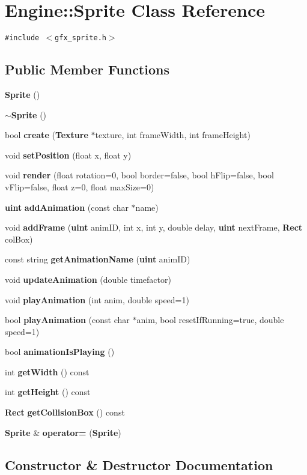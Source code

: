 \section{Engine::Sprite Class Reference}
\label{classEngine_1_1Sprite}
{\tt \#include $<$gfx\_\-sprite.h$>$}

\subsection*{Public Member Functions}
\begin{CompactItemize}
\item 
{\bf Sprite} ()
\item 
{\bf $\sim$Sprite} ()
\item 
bool {\bf create} ({\bf Texture} $\ast$texture, int frameWidth, int frameHeight)
\item 
void {\bf setPosition} (float x, float y)
\item 
void {\bf render} (float rotation=0, bool border=false, bool hFlip=false, bool vFlip=false, float z=0, float maxSize=0)
\item 
{\bf uint} {\bf addAnimation} (const char $\ast$name)
\item 
void {\bf addFrame} ({\bf uint} animID, int x, int y, double delay, {\bf uint} nextFrame, {\bf Rect} colBox)
\item 
const string {\bf getAnimationName} ({\bf uint} animID)
\item 
void {\bf updateAnimation} (double timefactor)
\item 
void {\bf playAnimation} (int anim, double speed=1)
\item 
bool {\bf playAnimation} (const char $\ast$anim, bool resetIfRunning=true, double speed=1)
\item 
bool {\bf animationIsPlaying} ()
\item 
int {\bf getWidth} () const 
\item 
int {\bf getHeight} () const 
\item 
{\bf Rect} {\bf getCollisionBox} () const 
\item 
{\bf Sprite} \& {\bf operator=} ({\bf Sprite})
\end{CompactItemize}


\subsection{Constructor \& Destructor Documentation}
